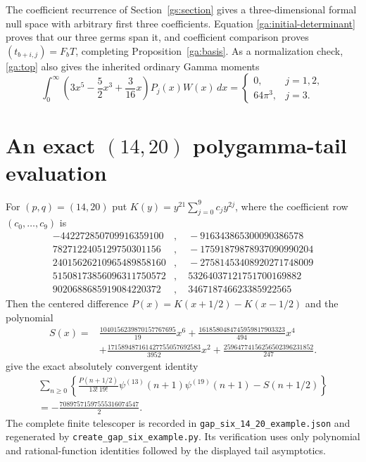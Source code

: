 \documentclass[11pt,a4paper]{article}
\theoremstyle{definition}
\theoremstyle{remark}
\numberwithin{equation}{section}
\begin{document}
The coefficient recurrence of Section~\ref{gs:section} gives a
three-dimensional formal null space with arbitrary first three
coefficients.  Equation \eqref{ga:initial-determinant} proves that
our three germs span it, and coefficient comparison proves
$(t_{b+i,j})=F_bT$, completing Proposition~\ref{ga:basis}.
As a normalization check, \eqref{ga:top} also gives the inherited
ordinary Gamma moments
\[
 \int_0^\infty\left(3x^5-\frac52x^3+\frac3{16}x\right)
                 P_j(x)W(x)\,dx
 =\begin{cases}0,&j=1,2,\\64\pi^3,&j=3.\end{cases}
\]


\section{An exact \texorpdfstring{$(14,20)$}{(14,20)} polygamma-tail evaluation}
\label{example:section}
For $(p,q)=(14,20)$ put $K(y)=y^{21}\sum_{j=0}^{9}c_jy^{2j}$,
where the coefficient row $(c_0,\ldots,c_9)$ is
\[\begin{aligned}
-442272850709916359100&,\quad -916343865300090386578\\
7827122405129750301156&,\quad -17591879878937090990204\\
24015626210965489858160&,\quad -27581453408920271748009\\
51508173856096311750572&,\quad 53264037121751700169882\\
9020688685919084220372&,\quad 346718746623385922565
\end{aligned}\]
Then the centered difference $P(x)=K(x+1/2)-K(x-1/2)$ and the polynomial
\[\begin{aligned}
 S(x)={}&\frac{1040156239870157767695}{19}x^{6}
       +\frac{1618580484745959817903323}{494}x^{4}\\
       &+\frac{171589487161427755057692583}{3952}x^{2}
       +\frac{25964774156256502396231852}{247}.
\end{aligned}\]
give the exact absolutely convergent identity
\[\begin{aligned}
 \sum_{n\ge0}\left\{\frac{P(n+1/2)}{13!\,19!}
 \psi^{(13)}(n+1)\psi^{(19)}(n+1)-S(n+1/2)\right\}\\
 =-\frac{70897571597555316074547}{2}.
\end{aligned}\]
The complete finite telescoper is recorded in \texttt{gap\_six\_14\_20\_example.json} and regenerated by \texttt{create\_gap\_six\_example.py}. Its verification uses only polynomial and rational-function identities followed by the displayed tail asymptotics.
\end{document}
